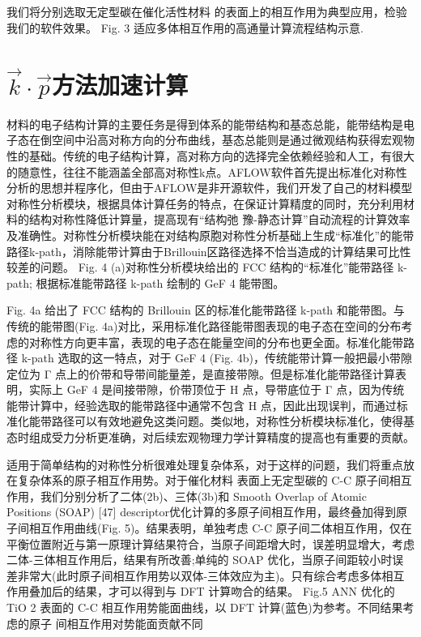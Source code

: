 我们将分别选取无定型碳在催化活性材料  的表面上的相互作用为典型应用，检验我们的软件效果。
Fig. 3 适应多体相互作用的高通量计算流程结构示意.

\section{$\vec k\cdot\vec p$方法加速计算}
材料的电子结构计算的主要任务是得到体系的能带结构和基态总能，能带结构是电子态在倒空间中沿高对称方向的分布曲线，基态总能则是通过微观结构获得宏观物性的基础。传统的电子结构计算，高对称方向的选择完全依赖经验和人工，有很大的随意性，往往不能涵盖全部高对称性k点。AFLOW软件首先提出标准化对称性分析的思想并程序化，但由于AFLOW是非开源软件，我们开发了自己的材料模型对称性分析模块，根据具体计算任务的特点，在保证计算精度的同时，充分利用材料的结构对称性降低计算量，提高现有“结构弛 豫-静态计算”自动流程的计算效率及准确性。对称性分析模块能在对结构原胞对称性分析基础上生成“标准化”的能带路径k-path，消除能带计算由于Brillouin区路径选择不恰当造成的计算结果可比性较差的问题。
Fig. 4 (a)对称性分析模块给出的 FCC 结构的“标准化”能带路径 k-path;
根据标准能带路径 k-path 绘制的 GeF 4
能带图。

Fig. 4a 给出了 FCC 结构的 Brillouin 区的标准化能带路径 k-path 和能带图。与传统的能带图(Fig. 4a)对比，采用标准化路径能带图表现的电子态在空间的分布考虑的对称性方向更丰富，表现的电子态在能量空间的分布也更全面。标准化能带路径 k-path 选取的这一特点，对于 GeF 4 (Fig. 4b)，传统能带计算一般把最小带隙定位为 Γ 点上的价带和导带间能量差，是直接带隙。但是标准化能带路径计算表明，实际上 GeF 4 是间接带隙，价带顶位于 H 点，导带底位于 Γ 点，因为传统能带计算中，经验选取的能带路径中通常不包含 H 点，因此出现误判，而通过标准化能带路径可以有效地避免这类问题。类似地，对称性分析模块标准化，使得基态时组成受力分析更准确，对后续宏观物理力学计算精度的提高也有重要的贡献。

适用于简单结构的对称性分析很难处理复杂体系，对于这样的问题，我们将重点放在复杂体系的原子相互作用势。对于催化材料  表面上无定型碳的 C-C 原子间相互作用，我们分别分析了二体(2b)、三体(3b)和 Smooth Overlap of Atomic Positions (SOAP) [47] descriptor优化计算的多原子间相互作用，最终叠加得到原子间相互作用曲线(Fig. 5)。结果表明，单独考虑 C-C 原子间二体相互作用，仅在平衡位置附近与第一原理计算结果符合，当原子间距增大时，误差明显增大，考虑二体-三体相互作用后，结果有所改善;单纯的 SOAP 优化，当原子间距较小时误差非常大(此时原子间相互作用势以双体-三体效应为主)。只有综合考虑多体相互作用叠加后的结果，才可以得到与 DFT 计算吻合的结果。
Fig.5 ANN 优化的 TiO 2 表面的 C-C 相互作用势能面曲线，以 DFT 计算(蓝色)为参考。不同结果考虑的原子 间相互作用对势能面贡献不同

